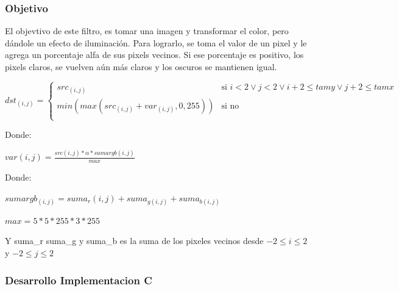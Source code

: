 \vspace*{0.3cm} \noindent
\subsubsection{Objetivo}

El objevtivo de este filtro, es tomar una imagen y transformar el color, pero dándole un efecto de iluminación. \newline
Para lograrlo, se toma el valor de un pixel y le agrega un porcentaje alfa de sus pixels vecinos. \newline
Si ese porcentaje es positivo, los pixels claros, se vuelven aún más claros y los oscuros se mantienen igual.\newline

       
\[ dst_{(i,j)} = \left\{ \begin{array}{ll}
         src_{(i,j)} & \mbox{si $i < 2 \vee j < 2 \vee i + 2 \leq tamy \vee j + 2 \leq tamx  $}\\
        min(max(src_{(i,j)} + var_{(i,j)},0, 255)) & \mbox{si no}\\\end{array} \right. \]     
        
Donde:

$var (i,j) = \frac{src(i, j) * \alpha * sumargb (i,j)}{max}$ \newline

Donde:\newline

$sumargb_{(i,j)} = suma_r{(i,j)} + suma_{g(i,j)} + suma_{b(i,j)}$ \newline

$max = 5 * 5 * 255 * 3 * 255$\newline

Y suma\_r suma\_g y suma\_b es la suma de los pixeles vecinos desde $-2 \leq i \leq 2$ y $-2 \leq j \leq 2$

\vspace*{0.3cm} \noindent

\subsubsection{Desarrollo Implementacion C}

